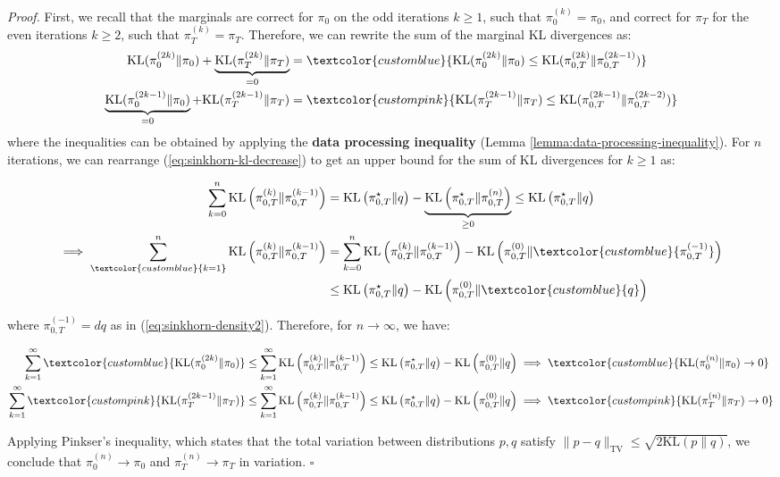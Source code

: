 \documentclass{article}
\newcommand{\bluetext}[1]{\textcolor{customblue}{#1}}
\newcommand{\pinktext}[1]{\textcolor{custompink}{#1}}
\begin{document}
\textit{Proof.} First, we recall that the marginals are correct for $\pi_0$ on the odd iterations $k\geq 1$, such that $\pi^{(k)}_0=\pi_0$, and correct for $\pi_T$ for the even iterations $k\geq 2$, such that $\pi^{(k)}_{T}=\pi_T$. Therefore, we can rewrite the sum of the marginal KL divergences as:
\begin{align}
    \text{KL}(\pi^{(2k)}_{0}\|\pi_{0})+\underbrace{\text{KL}(\pi^{(2k)}_{T}\|\pi_{T})}_{=0}&=\bluetext{\text{KL}(\pi^{(2k)}_{0}\|\pi_{0})\leq \text{KL}(\pi^{(2k)}_{0,T}\|\pi_{0,T}^{(2k-1)})}\\
    \underbrace{\text{KL}(\pi^{(2k-1)}_{0}\|\pi_{0})}_{=0}+\text{KL}(\pi^{(2k-1)}_{T}\|\pi_{T})&=\pinktext{\text{KL}(\pi^{(2k-1)}_{T}\|\pi_{T})\leq \text{KL}(\pi^{(2k-1)}_{0,T}\|\pi_{0,T}^{(2k-2)})}
\end{align}
where the inequalities can be obtained by applying the \textbf{data processing inequality} (Lemma \ref{lemma:data-processing-inequality}). For $n$ iterations, we can rearrange (\ref{eq:sinkhorn-kl-decrease}) to get an upper bound for the sum of KL divergences for $k\geq 1$ as:
\begin{small}
\begin{align}
    \sum_{k=0}^n\text{KL}\left(\pi^{(k)}_{0,T}\|\pi^{(k-1)}_{0,T}\right)&=\text{KL}\left(\pi^\star_{0,T}\|q\right)-\underbrace{\text{KL}\left(\pi^\star_{0,T}\|\pi^{(n)}_{0,T}\right)}_{\geq 0}\leq \text{KL}\left(\pi^\star_{0,T}\|q\right)\\
    \implies \sum_{\bluetext{k=1}}^n\text{KL}\left(\pi^{(k)}_{0,T}\|\pi^{(k-1)}_{0,T}\right)&=\sum_{k=0}^n\text{KL}\left(\pi^{(k)}_{0,T}\|\pi^{(k-1)}_{0,T}\right)-\text{KL}\left(\pi^{(0)}_{0,T}\|\bluetext{\pi^{(-1)}_{0,T}}\right)\nonumber\\
    &\leq \text{KL}\left(\pi^\star_{0,T}\|q\right)-\text{KL}\left(\pi^{(0)}_{0,T}\|\bluetext{q}\right)
\end{align}
\end{small}
where $\pi^{(-1)}_{0,T}=dq$ as in (\ref{eq:sinkhorn-density2}). Therefore, for $n \to \infty$, we have: 
\begin{small}
\begin{align}
    \sum_{k=1}^\infty\bluetext{\text{KL}(\pi^{(2k)}_{0}\|\pi_{0})}\leq \sum_{k=1}^\infty\text{KL}\left(\pi^{(k)}_{0,T}\|\pi^{(k-1)}_{0,T}\right)\leq \text{KL}\left(\pi^\star_{0,T}\|q\right)-\text{KL}\left(\pi^{(0)}_{0,T}\|q\right)&\implies\bluetext{\text{KL}(\pi^{(n)}_{0}\|\pi_{0})\to 0} \\
    \sum_{k=1}^\infty\pinktext{\text{KL}(\pi^{(2k-1)}_{T}\|\pi_{T})}\leq \sum_{k=1}^\infty\text{KL}\left(\pi^{(k)}_{0,T}\|\pi^{(k-1)}_{0,T}\right)\leq \text{KL}\left(\pi^\star_{0,T}\|q\right)-\text{KL}\left(\pi^{(0)}_{0,T}\|q\right)&\implies \pinktext{\text{KL}(\pi^{(n)}_T\|\pi_T)\to 0}
\end{align}
\end{small}
Applying Pinkser's inequality, which states that the total variation between distributions $p, q$ satisfy $\|p-q\|_{\text{TV}}\leq \sqrt{2\text{KL}(p\|q)}$, we conclude that $\pi^{(n)}_0\to \pi_0$ and $\pi^{(n)}_T\to \pi_T$ in variation. \hfill $\square$
\end{document}
